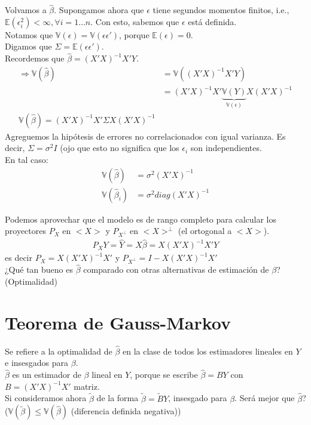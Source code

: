 \documentclass[10pt]{article}
\theoremstyle{plain}
\theoremstyle{definition}
\begin{document}
Volvamos a $\hat{\beta}$. Supongamos ahora que $\epsilon$ tiene segundos momentos finitos, i.e., $\mathbb{E}(\epsilon_{i}^2) < \infty, \forall i = 1\ldots n$. Con esto, sabemos que $\mathbb{\epsilon}$ está definida.\\
Notamos que $\mathbb{V}(\epsilon) = \mathbb{V}(\epsilon\epsilon')$, porque $\mathbb{E}(\epsilon) = 0$.\\
Digamos que $\Sigma = \mathbb{E}(\epsilon\epsilon')$.\\
Recordemos que $\hat{\beta} = (X'X)^{-1}X'Y$.\\
\begin{align*}
\Rightarrow \mathbb{V}(\hat{\beta}) &= \mathbb{V}((X'X)^{-1}X'Y)\\
&= (X'X)^{-1}X' \underbrace{\mathbb{V}(Y)}_{\mathbb{V}(\epsilon)}X(X'X)^{-1}\\
\mathbb{V}(\hat{\beta}) = (X'X)^{-1}X' \Sigma X(X'X)^{-1}
\end{align*}
Agreguemos la hipótesis de errores no correlacionados con igual varianza. Es decir, $\Sigma = \sigma^2 I$ (ojo que esto no significa que los $\epsilon_{i}$ son independientes.\\

En tal caso:
\begin{align*}
\mathbb{V}(\hat{\beta}) &= \sigma^2(X'X)^{-1}\\
\mathbb{V}(\hat{\beta}_{i}) &= \sigma^2 diag(X'X)^{-1}
\end{align*}

Podemos aprovechar que el modelo es de rango completo para calcular los proyectores $P_{X}$ en $<X>$ y $P_{X^{\perp}}$ en $<X>^{\perp}$ (el ortogonal a $<X>$).
\begin{align*}
P_{X}Y = \hat{Y} = X \hat{\beta} = X(X'X)^{-1}X'Y
\end{align*}
es decir $P_{X}= X(X'X)^{-1}X'$ y $P_{X^{\perp}} = I - X(X'X)^{-1}X'$\\

¿Qué tan bueno es $\hat{\beta}$ comparado con otras alternativas de estimación de $\beta$? (Optimalidad)

\section{Teorema de Gauss-Markov}
Se refiere a la optimalidad de $\hat{\beta}$ en la clase de todos los estimadores lineales en $Y$ e insesgados para $\beta$.\\
$\hat{\beta}$ es un estimador de $\beta$ lineal en $Y$, porque se escribe $\hat{\beta} = BY$ con $B=(X'X)^{-1}X'$ matriz.\\
Si consideramos ahora $\tilde{\beta}$ de la forma $\tilde{\beta} = \tilde{B}Y$, insesgado para $\beta$. Será mejor que $\hat{\beta}$? ($\mathbb{V}(\tilde{\beta}) \le \mathbb{V}(\hat{\beta})$ (diferencia definida negativa))\\
\end{document}
